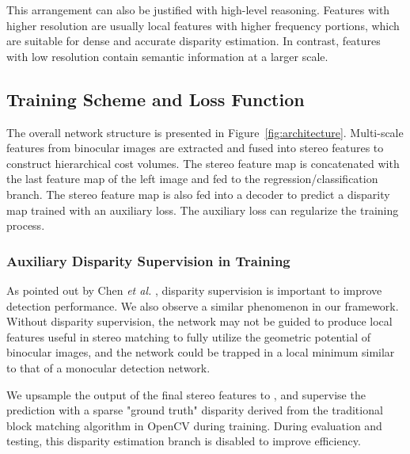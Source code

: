 \documentclass[letterpaper, 10 pt, conference]{ieeeconf}
\begin{document}
This arrangement can also be justified with high-level reasoning.
Features with higher resolution are usually local features with higher frequency portions, which are suitable for dense and accurate disparity estimation. In contrast, features with low resolution contain semantic information at a larger scale. 

\subsection{Training Scheme and Loss Function}
\label{sec.training}
The overall network structure is presented in Figure~\ref{fig:architecture}.
Multi-scale features from binocular images are extracted and fused into stereo features to construct hierarchical cost volumes.
The stereo feature map is concatenated with the last feature map of the left image and fed to the regression/classification branch.
The stereo feature map is also fed into a decoder to predict a disparity map trained with an auxiliary loss. The auxiliary loss can regularize the training process.

\subsubsection{Auxiliary Disparity Supervision in Training}

As pointed out by Chen \textit{et al.} \cite{Chen2020DSGN}, disparity supervision is important to improve detection performance.
We also observe a similar phenomenon in our framework.
Without disparity supervision, the network may not be guided to produce local features useful in stereo matching to fully utilize the geometric potential of binocular images, and the network could be trapped in a local minimum similar to that of a monocular detection network.


We upsample the output of the final stereo features to , and supervise the prediction with a sparse "ground truth" disparity derived from the traditional block matching algorithm in OpenCV \cite{opencv_library} during training.
During evaluation and testing, this disparity estimation branch is disabled to improve efficiency.
\end{document}

